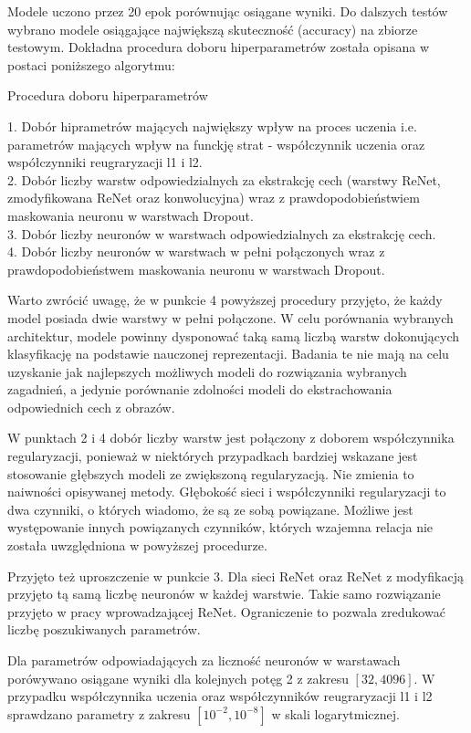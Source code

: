 \documentclass[oneside, mag]{mgr}
\begin{document}
Modele uczono przez 20 epok porównując osiągane wyniki. Do dalszych testów wybrano modele osiągające największą skuteczność (accuracy) na zbiorze testowym. Dokładna procedura doboru hiperparametrów została opisana w postaci poniższego algorytmu:

\begin{algorithm}[H]
\SetAlgoLined
\caption{Procedura doboru hiperparametrów}
1. Dobór hiprametrów mających największy wpływ na proces uczenia i.e. parametrów mających wpływ na funckję strat - współczynnik uczenia oraz współczynniki reugraryzacji l1 i l2.\\
2. Dobór liczby warstw odpowiedzialnych za ekstrakcję cech (warstwy ReNet, zmodyfikowana ReNet oraz konwolucyjna) wraz z prawdopodobieństwiem maskowania neuronu w warstwach Dropout.\\
3. Dobór liczby neuronów w warstwach odpowiedzialnych za ekstrakcję cech.\\
4. Dobór liczby neuronów w warstwach w pełni połączonych wraz z prawdopodobieństwem maskowania neuronu w warstwach Dropout.\\
\end{algorithm}

Warto zwrócić uwagę, że w punkcie 4 powyższej procedury przyjęto, że każdy model posiada dwie warstwy w pełni połączone. W celu porównania wybranych architektur, modele powinny dysponować taką samą liczbą warstw dokonujących klasyfikację na podstawie nauczonej reprezentacji. Badania te nie mają na celu uzyskanie jak najlepszych możliwych modeli do rozwiązania wybranych zagadnień, a jedynie porównanie zdolności modeli do ekstrachowania odpowiednich cech z obrazów.

W punktach 2 i 4 dobór liczby warstw jest połączony z doborem współczynnika regularyzacji, ponieważ w niektórych przypadkach bardziej wskazane jest stosowanie głębszych modeli ze zwiększoną regularyzacją. Nie zmienia to naiwności opisywanej metody. Głębokość sieci i współczynniki regularyzacji to dwa czynniki, o których wiadomo, że są ze sobą powiązane. Możliwe jest występowanie innych powiązanych czynników, których wzajemna relacja nie została uwzględniona w powyższej procedurze. 

Przyjęto też uproszczenie w punkcie 3. Dla sieci ReNet oraz ReNet z modyfikacją przyjęto tą samą liczbę neuronów w każdej warstwie. Takie samo rozwiązanie przyjęto w pracy wprowadzającej ReNet. Ograniczenie to pozwala zredukować liczbę poszukiwanych parametrów.

Dla parametrów odpowiadających za liczność neuronów w warstawach porówywano osiągane wyniki dla kolejnych potęg 2 z zakresu $[32, 4096]$. W przypadku współczynnika uczenia oraz współczynników reugraryzacji l1 i l2 sprawdzano parametry z zakresu $[10^{-2}, 10^{-8}]$ w skali logarytmicznej.
\end{document}

